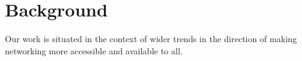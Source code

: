 \section{Background}
\label{sec:background}

Our work is situated in the context of wider trends in the direction of making networking more accessible and available to all.



%

%

%



%

